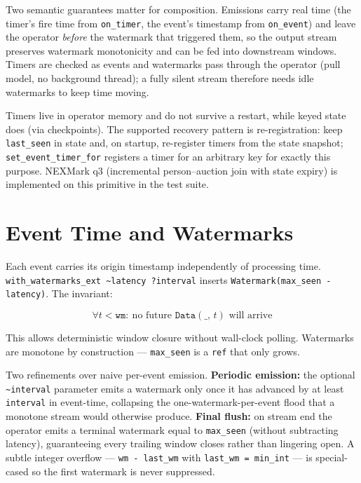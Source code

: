 \documentclass[11pt,a4paper]{article}
\begin{document}
Two semantic guarantees matter for composition. Emissions carry real
time (the timer's fire time from \texttt{on\_timer}, the event's
timestamp from \texttt{on\_event}) and leave the operator \emph{before}
the watermark that triggered them, so the output stream preserves
watermark monotonicity and can be fed into downstream windows. Timers
are checked as events and watermarks pass through the operator (pull
model, no background thread); a fully silent stream therefore needs
idle watermarks to keep time moving.

Timers live in operator memory and do not survive a restart, while
keyed state does (via checkpoints). The supported recovery pattern is
re-registration: keep \texttt{last\_seen} in state and, on startup,
re-register timers from the state snapshot;
\texttt{set\_event\_timer\_for} registers a timer for an arbitrary key
for exactly this purpose. NEXMark q3 (incremental person--auction join
with state expiry) is implemented on this primitive in the test suite.

\section{Event Time and Watermarks}

Each event carries its origin timestamp independently of processing
time. \texttt{with\_watermarks\_ext \textasciitilde{}latency ?interval}
inserts \texttt{Watermark(max\_seen - latency)}. The invariant:

\[
  \forall t < \mathtt{wm}:\ \text{no future } \mathtt{Data}(\_,\, t)
  \text{ will arrive}
\]

This allows deterministic window closure without wall-clock polling.
Watermarks are monotone by construction — \texttt{max\_seen} is a
\texttt{ref} that only grows.

Two refinements over naive per-event emission. \textbf{Periodic
emission:} the optional \texttt{\textasciitilde{}interval} parameter
emits a watermark only once it has advanced by at least
\texttt{interval} in event-time, collapsing the one-watermark-per-event
flood that a monotone stream would otherwise produce. \textbf{Final
flush:} on stream end the operator emits a terminal watermark equal to
\texttt{max\_seen} (without subtracting latency), guaranteeing every
trailing window closes rather than lingering open. A subtle integer
overflow — \texttt{wm - last\_wm} with \texttt{last\_wm = min\_int} —
is special-cased so the first watermark is never suppressed.
\end{document}
